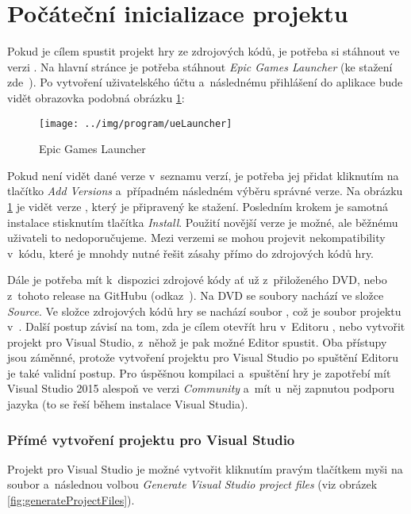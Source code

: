 
\section{Počáteční inicializace projektu}

Pokud je cílem spustit projekt hry ze zdrojových kódů, je potřeba si stáhnout \UE{} ve verzi . Na hlavní stránce \UE{} je potřeba stáhnout \textit{Epic Games Launcher} (ke stažení zde~\citep{ue_download}). Po vytvoření uživatelského účtu a~následnému přihlášení do aplikace bude vidět obrazovka podobná obrázku \ref{fig:ueLauncher}:


\begin{figure}[!ht]\centering
\texttt{[image: ../img/program/ueLauncher]}

\caption{Epic Games Launcher}
\label{fig:ueLauncher}

\end{figure}

\FloatBarrier

Pokud není vidět \UE{} dané verze v~seznamu verzí, je potřeba jej přidat kliknutím na tlačítko \textit{Add Versions} a~případném následném výběru správné verze. Na obrázku \ref{fig:ueLauncher} je vidět \UE{} verze , který je připravený ke stažení. Posledním krokem je samotná instalace stisknutím tlačítka \textit{Install}. Použití novější verze \UEu{} je možné, ale běžnému uživateli to nedoporučujeme. Mezi verzemi se mohou projevit nekompatibility v~kódu, které je mnohdy nutné řešit zásahy přímo do zdrojových kódů hry.

Dále je potřeba mít k~dispozici zdrojové kódy ať už z~přiloženého DVD, nebo z~tohoto release na GitHubu (odkaz~\citep{gh_finalRelease}). Na DVD se soubory nachází ve složce \textit{Source}. Ve složce zdrojových kódů hry se nachází soubor , což je soubor projektu v~\UEu{}. Další postup závisí na tom, zda je cílem otevřít hru v~Editoru \UEu{}, nebo vytvořit projekt pro Visual Studio, z~něhož je pak možné Editor spustit. Oba přístupy jsou záměnné, protože vytvoření projektu pro Visual Studio po spuštění Editoru je také validní postup. Pro úspěšnou kompilaci a~spuštění hry je zapotřebí mít Visual Studio 2015 alespoň ve verzi \textit{Community} a~mít u~něj zapnutou podporu jazyka \CPP{} (to se řeší během instalace Visual Studia).
 
\subsubsection{Přímé vytvoření projektu pro Visual Studio}
Projekt pro Visual Studio je možné vytvořit kliknutím pravým tlačítkem myši na soubor  a~následnou volbou \textit{Generate Visual Studio project files} (viz obrázek \ref{fig:generateProjectFiles}). 

